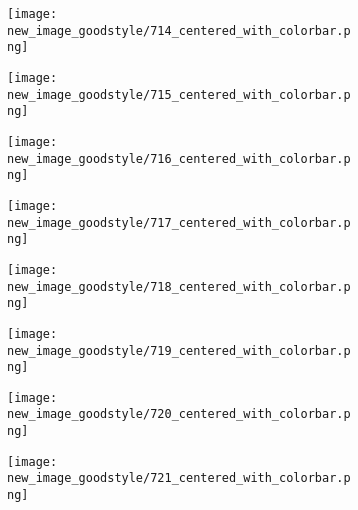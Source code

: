 \documentclass[a4paper,12pt]{article}
\begin{document}
\begin{figure}[H]
  \begin{subfigure}{0.11\textwidth}
    \texttt{[image: new\_image\_goodstyle/714\_centered\_with\_colorbar.png]}
  \end{subfigure}
  \hfill
  \begin{subfigure}{0.11\textwidth}
    \texttt{[image: new\_image\_goodstyle/715\_centered\_with\_colorbar.png]}
  \end{subfigure}
  \hfill
  \begin{subfigure}{0.11\textwidth}
    \texttt{[image: new\_image\_goodstyle/716\_centered\_with\_colorbar.png]}
  \end{subfigure}
  \hfill
  \begin{subfigure}{0.11\textwidth}
    \texttt{[image: new\_image\_goodstyle/717\_centered\_with\_colorbar.png]}
  \end{subfigure}
  \hfill
  \begin{subfigure}{0.11\textwidth}
    \texttt{[image: new\_image\_goodstyle/718\_centered\_with\_colorbar.png]}
  \end{subfigure}
  \hfill
  \begin{subfigure}{0.11\textwidth}
    \texttt{[image: new\_image\_goodstyle/719\_centered\_with\_colorbar.png]}
  \end{subfigure}
  \hfill
  \begin{subfigure}{0.11\textwidth}
    \texttt{[image: new\_image\_goodstyle/720\_centered\_with\_colorbar.png]}
  \end{subfigure}
  \hfill
  \begin{subfigure}{0.11\textwidth}
    \texttt{[image: new\_image\_goodstyle/721\_centered\_with\_colorbar.png]}
  \end{subfigure}
  \hfill
\end{figure}
\end{document}

